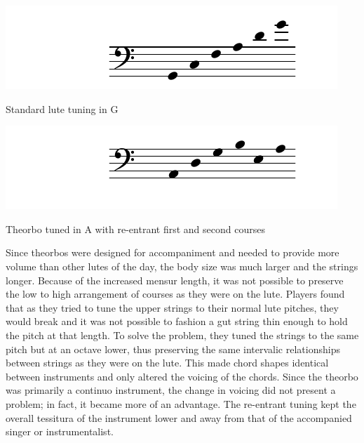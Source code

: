 \begin{example}[h]
\centering
\includegraphics{examples/lute-tuning.pdf}
\caption{Standard lute tuning in G}
\label{g-lute}
\end{example}
\begin{example}[h]
\centering
\includegraphics{examples/theorbo-tuning.pdf}
\caption{Theorbo tuned in A with re-entrant first and second courses}
\label{a-theorbo}
\end{example}

Since theorbos were designed for accompaniment and needed to provide more volume than other lutes of the day, the body
size was much larger and the strings longer. Because of the increased mensur length, it was not possible to preserve the
low to high arrangement of courses as they were on the lute. Players found that as they tried to tune the upper strings
to their normal lute pitches, they would break and it was not possible to fashion a gut string thin enough to hold the
pitch at that length. To solve the problem, they tuned the strings to the same pitch but at an octave lower, thus
preserving the same intervalic relationships between strings as they were on the lute. This made chord shapes identical
between instruments and only altered the voicing of the chords. Since the theorbo was primarily a continuo instrument,
the change in voicing did not present a problem; in fact, it became more of an advantage. The re-entrant tuning kept the
overall tessitura of the instrument lower and away from that of the accompanied singer or instrumentalist.

